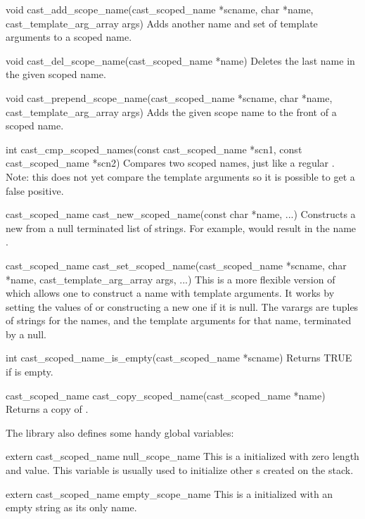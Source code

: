 \begin{cprototypelist}
  \item[void cast_add_scope_name(cast_scoped_name *scname, char
  *name, cast_template_arg_array args)] Adds another name and set of template
  arguments to a scoped name.

  \item[void cast_del_scope_name(cast_scoped_name *name)] Deletes
  the last name in the given scoped name.

  \item[void cast_prepend_scope_name(cast_scoped_name *scname, char
  *name, cast_template_arg_array args)] Adds the given scope name to the front
  of a scoped name.

  \item[int cast_cmp_scoped_names(const cast_scoped_name *scn1,
  const cast_scoped_name *scn2)] Compares two scoped names, just like a
  regular .  Note: this does not yet compare the template
  arguments so it is possible to get a false positive.

  \item[cast_scoped_name cast_new_scoped_name(const char *name,
  ...)] Constructs a new  from a null terminated list
  of strings.  For example,  would result in the name .

  \item[cast_scoped_name cast_set_scoped_name(cast_scoped_name *scname, char
  *name, cast_template_arg_array args, ...)] This is a more flexible version of
   which allows one to construct a name with
  template arguments.  It works by setting the values of 
  or constructing a new one if it is null.  The varargs are tuples of strings
  for the names, and the template arguments for that name, terminated by a
  null.

  \item[int cast_scoped_name_is_empty(cast_scoped_name *scname)]
  Returns TRUE if  is empty.

  \item[cast_scoped_name cast_copy_scoped_name(cast_scoped_name
  *name)] Returns a copy of .
\end{cprototypelist}
%
The \CAST{} library also defines some handy global variables:

\begin{cprototypelist}
  \item[extern cast_scoped_name null_scope_name] This is a
   initialized with zero length and value.  This
  variable is usually used to initialize other s
  created on the stack.

  \item[extern cast_scoped_name empty_scope_name] This is a
   initialized with an empty string as its only name.
\end{cprototypelist}

